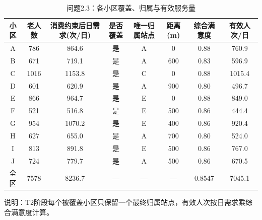 \begin{table}[htbp]
\centering
\caption{问题2.3：各小区覆盖、归属与有效服务量}
\begin{tabular}{|c|c|c|c|c|c|c|c|}
\hline
小区 & 老人数 & 消费约束后日需求(次/日) & 是否覆盖 & 唯一归属站点 & 距离(m) & 综合满意度 & 有效人次/日 \\
\hline
A & 786 & 864.6 & 是 & A & 0 & 0.88 & 760.9 \\
B & 671 & 719.1 & 是 & A & 600 & 0.83 & 596.9 \\
C & 1016 & 1153.8 & 是 & C & 0 & 0.88 & 1015.4 \\
D & 601 & 620.9 & 是 & A & 900 & 0.80 & 496.7 \\
E & 866 & 964.7 & 是 & E & 0 & 0.88 & 849.0 \\
F & 521 & 516.8 & 是 & E & 500 & 0.86 & 444.4 \\
G & 954 & 1070.2 & 是 & E & 400 & 0.86 & 920.4 \\
H & 627 & 655.0 & 是 & A & 700 & 0.80 & 524.0 \\
I & 813 & 891.8 & 是 & E & 500 & 0.86 & 767.0 \\
J & 724 & 779.7 & 是 & A & 500 & 0.86 & 670.5 \\
\hline
全区 & 7578 & 8236.7 & — & — & — & 0.8547 & 7045.1 \\
\hline
\end{tabular}
\vspace{0.2cm}
说明：T2阶段每个被覆盖小区只保留一个最终归属站点，有效人次按日需求乘综合满意度计算。
\end{table}
